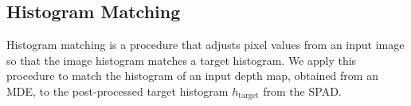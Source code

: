 %


\subsection{Histogram Matching}
%  
Histogram matching is a procedure that adjusts pixel values from an input image
so that the image histogram matches a target histogram. We apply this procedure
to match the histogram of an input depth map, obtained from an MDE, to the
post-processed target histogram $h_\text{target}$ from the SPAD. 

